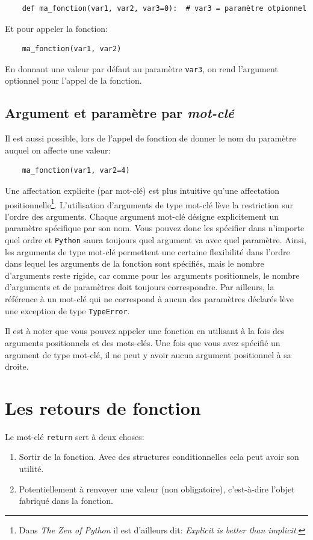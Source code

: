 \documentclass[a4paper,11pt]{book}
\begin{document}
\begin{verbatim}
    def ma_fonction(var1, var2, var3=0):  # var3 = paramètre otpionnel
\end{verbatim}
\medskip

Et pour appeler la fonction:
\begin{verbatim}
    ma_fonction(var1, var2)
\end{verbatim}
\medskip

En donnant une valeur par défaut au paramètre \texttt{var3}, on rend l'argument optionnel pour l'appel de la fonction.
\medskip

\subsection*{Argument et paramètre par \textit{mot-clé}}
Il est aussi possible, lors de l'appel de fonction de donner le nom du paramètre auquel on affecte une valeur:
\begin{verbatim}
    ma_fonction(var1, var2=4)
\end{verbatim}
\medskip

Une affectation explicite (par mot-clé) est plus intuitive qu'une affectation positionnelle\footnote{Dans \textit{The Zen of Python} il est d'ailleurs dit: \og \textit{Explicit is better than implicit}\fg{}.}. L'utilisation d'arguments de type mot-clé lève la restriction sur l'ordre des arguments. Chaque argument mot-clé désigne explicitement un paramètre spécifique par son nom. Vous pouvez donc les spécifier dans n'importe quel ordre et \texttt{Python} saura toujours quel argument va avec quel paramètre. Ainsi, les arguments de type mot-clé permettent une certaine flexibilité dans l'ordre dans lequel les arguments de la fonction sont spécifiés, mais le nombre d'arguments reste rigide, car comme pour les arguments positionnels, le nombre d'arguments et de paramètres doit toujours correspondre. Par ailleurs, la référence à un mot-clé qui ne correspond à aucun des paramètres déclarés lève une exception de type \texttt{TypeError}.
\medskip

Il est à noter que vous pouvez appeler une fonction en utilisant à la fois des arguments positionnels et des mots-clés. Une fois que vous avez spécifié un argument de type mot-clé, il ne peut y avoir aucun argument positionnel à sa droite.
\medskip

\section{Les retours de fonction}
Le mot-clé \texttt{return} sert à deux choses:
\begin{enumerate}
	\item Sortir de la fonction. Avec des structures conditionnelles cela peut avoir son utilité.
	\item Potentiellement à renvoyer une valeur (non obligatoire), c'est-à-dire l'objet fabriqué dans la fonction.
\end{enumerate}
\medskip
\end{document}
